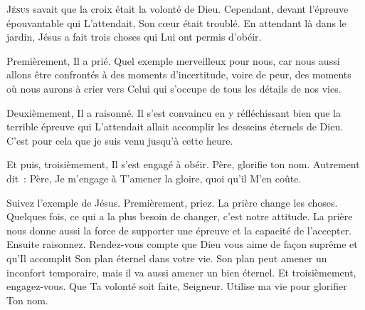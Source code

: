 

\lettrine{J}{ésus} savait que la croix était la volonté de Dieu.
 Cependant, devant l'épreuve épouvantable qui L'attendait,
 Son cœur était troublé. En attendant là dans le jardin,
 Jésus a fait trois choses qui Lui ont permis d'obéir.

Premièrement, Il a prié. Quel exemple merveilleux pour nous,
 car nous aussi allons être confrontés à des moments d'incertitude,
 voire de peur, des moments où nous aurons à crier vers Celui
 qui s'occupe de tous les détails de nos vies.


Deuxièmement, Il a raisonné. Il s'est convaincu en y réfléchissant
 bien que la terrible épreuve qui L'attendait allait accomplir
 les desseins éternels de Dieu.
 \og C'est pour cela que je suis venu jusqu'à cette heure. \fg{}

Et puis, troisièmement, Il s'est engagé à obéir.
 \og Père, glorifie ton nom. \fg{}
 Autrement dit~: 
 \og Père, Je m'engage à T'amener la gloire, quoi qu'il M'en coûte. \fg{}

Suivez l'exemple de Jésus. Premièrement, priez.
 La prière change les choses. Quelques fois, 
 ce qui a la plus besoin de changer, c'est notre attitude.
 La prière nous donne aussi la force de supporter une épreuve
 et la capacité de l'accepter. Ensuite \ocadr raisonnez. 
 Rendez-vous compte que Dieu vous aime de façon suprême et qu'Il accomplit
 Son plan éternel dans votre vie.
 Son plan peut amener un inconfort temporaire, mais il va aussi amener
 un bien éternel. Et troisièmement, engagez-vous.
 \og Que Ta volonté soit faite, Seigneur.
 Utilise ma vie pour glorifier Ton nom. \fg{}

\dvrule


